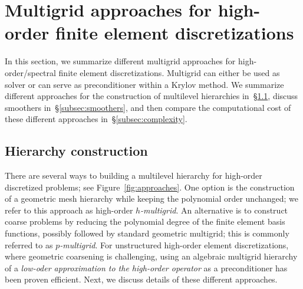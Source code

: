 \documentclass[smallcondensed,final]{svjour3}     %
\newcommand{\todo}[1]{\textcolor{red}{ #1}}
\begin{document}







\section{Multigrid approaches for high-order finite element discretizations}
\label{sec:approaches}

In this section, we summarize different multigrid approaches
for high-order/spectral finite element
discretizations. Multigrid can either be used as
solver or can serve as preconditioner within a Krylov method. We
summarize different approaches for the construction of
multilevel hierarchies in~\S\ref{subsec:hierarchy}, discuss
smoothers in~\S\ref{subsec:smoothers}, and then compare the
computational cost of these different approaches in~\S\ref{subsec:complexity}.

\subsection{Hierarchy construction}\label{subsec:hierarchy}
There are several ways to building a multilevel hierarchy for
high-order discretized problems; see Figure~\ref{fig:approaches}. One
option is the construction of a geometric mesh hierarchy while keeping
the polynomial order unchanged; we refer to this approach as
high-order \emph{$h$-multigrid}. An alternative is to construct coarse
problems by reducing the polynomial degree of the finite element basis
functions, possibly followed by standard geometric multigrid; this is
commonly referred to as \emph{$p$-multigrid}. For unstructured
high-order element discretizations, where geometric coarsening is
challenging, using an algebraic multigrid hierarchy of a
\emph{low-oder approximation to the high-order operator} as a
preconditioner has been proven efficient. Next, we discuss details of
these different approaches.
\end{document}

